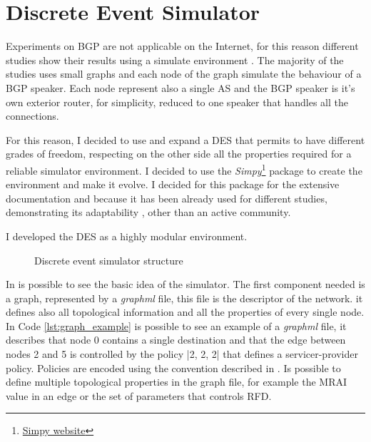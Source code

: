 \chapter{Discrete Event Simulator}
\label{cha:des}

Experiments on \ac{BGP} are not applicable on the Internet, for this
reason different studies show their results using a simulate environment
\cite{griffin2001experimental} .
The majority of the studies uses small graphs and each node
of the graph simulate the behaviour of a \ac{BGP} speaker.
Each node represent also a single \ac{AS} and the \ac{BGP} speaker is it's own
exterior router, for simplicity, reduced to one speaker that handles all the
connections.

For this reason, I decided to use and expand a \ac{DES} that permits to have
different grades of freedom, respecting on the other side all the properties
required for a reliable simulator environment.
I decided to use the \textit{Simpy}\footnote{\href{https://simpy.readthedocs.io/en/latest/index.html}{Simpy website}}
package to create the environment and make it evolve. I decided for this package for the
extensive documentation and because it has been already used for different
studies, demonstrating its adaptability \cite{matloff2008introduction,dagkakis2013manpy},
other than an active community.

I developed the \ac{DES} as a highly modular environment.
\begin{figure}[h]
    \begin{center}
        
    \end{center}
    \caption{Discrete event simulator structure}
    \label{fig:des_structure}
\end{figure}

In  is possible to see the basic idea of the simulator.
The first component needed is a graph, represented by a \textit{graphml} file,
this file is the descriptor of the network.
it defines also all topological information and all the properties of every single node.
In Code \ref{lst:graph_example} is possible to see an example of a \textit{graphml} file,
it describes that node \num{0} contains a single destination and that the edge
between nodes \num{2} and \num{5} is controlled by the policy |2, 2, 2| that defines
a servicer-provider policy.
Policies are encoded using the convention described in \cite{daggitt2018rate}.
Is possible to define multiple topological properties in the graph file, for
example the \ac{MRAI} value in an edge or the set of parameters that
controls \ac{RFD}.

